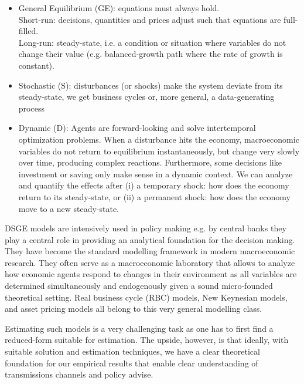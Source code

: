 \begin{itemize}
  \item General Equilibrium (GE): equations must always hold.
  \\
  Short-run: decisions, quantities and prices adjust such that equations are full-filled.
  \\
  Long-run: steady-state, i.e. a condition or situation where variables do not change their value 
  (e.g. balanced-growth path where the rate of growth is constant). 
  \item Stochastic (S): disturbances (or shocks) make the system deviate from its steady-state, 
  we get business cycles or, more general, a data-generating process
  \item Dynamic (D): Agents are forward-looking and solve intertemporal optimization problems. 
  When a disturbance hits the economy, macroeconomic variables do not return to equilibrium instantaneously, 
    but change very slowly over time, producing complex reactions. 
  Furthermore, some decisions like investment or saving only make sense in a dynamic context.
  We can analyze and quantify the effects after
		(i) a temporary shock: how does the economy return to its steady-state, or 
		(ii) a permanent shock: how does the economy move to a new steady-state.
\end{itemize}
DSGE models are intensively used in policy making e.g. by central banks they play a central role in providing an analytical foundation for the decision making.
They have become the standard modelling framework in modern macroeconomic research.
They often serve as a macroeconomic laboratory that allows to analyze how economic agents respond to changes in their environment
  as all variables are determined simultaneously and endogenously given a sound micro-founded theoretical setting.
Real business cycle (RBC) models, New Keynesian models, and asset pricing models
  all belong to this very general modelling class.

Estimating such models is a very challenging task as one has to first find a reduced-form suitable for estimation.
The upside, however, is that ideally, with suitable solution and estimation techniques,
  we have a clear theoretical foundation for our empirical results that enable clear understanding of transmissions channels and policy advise.

